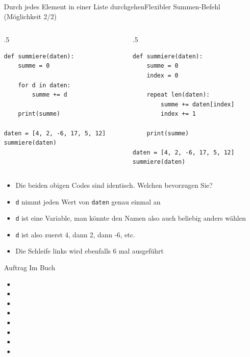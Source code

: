\begin{frame}[fragile]{Durch jedes Element in einer Liste durchgehen}{Flexibler Summen-Befehl (Möglichkeit 2/2)}
	\begin{columns}
	\begin{column}{.5\textwidth}
	\begin{lstlisting}
def summiere(daten):
	summe = 0

	for d in daten:
		summe += d

	print(summe)

daten = [4, 2, -6, 17, 5, 12] 
summiere(daten)
		\end{lstlisting}
	\end{column}
	\begin{column}{.5\textwidth}
	\begin{lstlisting}
def summiere(daten):
	summe = 0
	index = 0
	
	repeat len(daten):
		summe += daten[index]
		index += 1

	print(summe)

daten = [4, 2, -6, 17, 5, 12] 
summiere(daten)
		\end{lstlisting}
	\end{column}
	\end{columns}
\begin{itemize}[<+->]
	\item Die beiden obigen Codes sind identisch. Welchen bevorzugen Sie?
	\item \lstinline|d| nimmt jeden Wert von \lstinline|daten| genau einmal an
	\item \lstinline|d| ist eine Variable, man könnte den Namen also auch beliebig anders wählen
	\item \lstinline|d| ist also zuerst 4, dann 2, dann -6, etc.
	\item Die Schleife links wird ebenfalls 6 mal ausgeführt
\end{itemize}
\end{frame}

\begin{frame}[fragile]{Auftrag}
Im Buch
\begin{itemize}
	\item {}
	\item {}
	\item {}
	\item {}
	\item {}
	\item {}
	\item {}
	\item {}
\end{itemize}
\end{frame}


